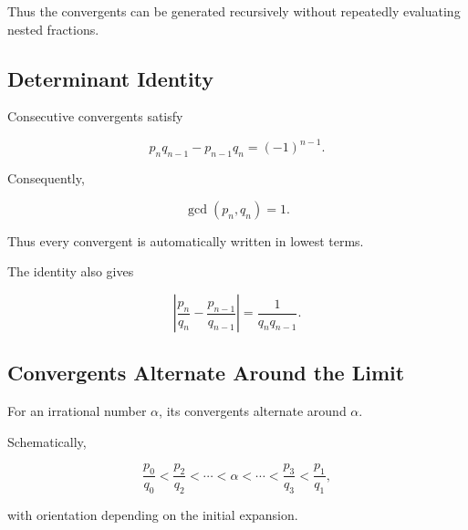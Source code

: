 Thus the convergents can be generated recursively without repeatedly
evaluating nested fractions.

\subsection{Determinant Identity}
\label{subsec:continued-fraction-determinant}

Consecutive convergents satisfy

\[ \boxed{p_nq_{n-1}-p_{n-1}q_n=(-1)^{n-1}.} \]

Consequently,

\[ \gcd(p_n,q_n)=1. \]

Thus every convergent is automatically written in lowest terms.

The identity also gives

\[
\left|
\frac{p_n}{q_n}-\frac{p_{n-1}}{q_{n-1}}
\right|
=
\frac1{q_nq_{n-1}}.
\]

\subsection{Convergents Alternate Around the Limit}
\label{subsec:convergents-alternate}

For an irrational number \(\alpha\), its convergents alternate around
\(\alpha\).

Schematically,

\[
\frac{p_0}{q_0}
<
\frac{p_2}{q_2}
<
\cdots
<
\alpha
<
\cdots
<
\frac{p_3}{q_3}
<
\frac{p_1}{q_1},
\]

with orientation depending on the initial expansion.

\begin{centereddiagram}
\end{centereddiagram}

